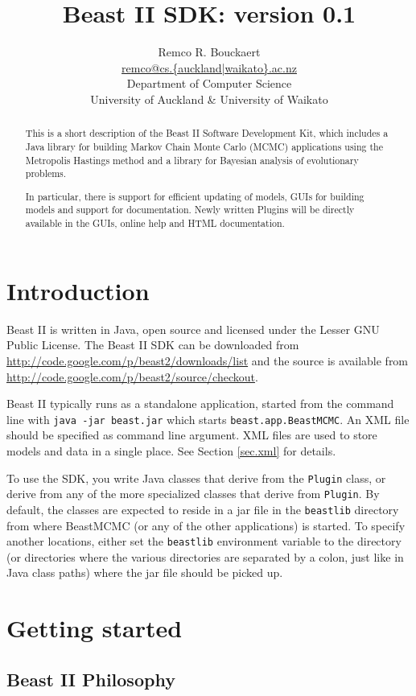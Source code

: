 \documentclass{article}
\title{Beast II SDK: version 0.1}
\author{Remco R. Bouckaert\\\url{remco@cs.{auckland|waikato}.ac.nz}\\
  Department of Computer Science\\
  University of Auckland \& University of Waikato
}
\begin{document}
\maketitle
\begin{abstract}
This is a short description of the Beast II Software Development Kit,
which includes a Java library for building Markov Chain Monte Carlo (MCMC) 
applications using the Metropolis Hastings method and a library for
Bayesian analysis of evolutionary problems.

In particular, there is support for efficient updating of models,
GUIs for building models and support for documentation. Newly written Plugins 
will be directly available in the GUIs, online help and HTML documentation.
\end{abstract}


\section{Introduction}

Beast II is written in Java, open source and licensed under the Lesser GNU Public License.
The Beast II SDK can be downloaded from \url{http://code.google.com/p/beast2/downloads/list}
and the source is available from \url{http://code.google.com/p/beast2/source/checkout}.

Beast II typically runs as a standalone application, started from the command line with
{\tt java -jar beast.jar} which starts {\tt beast.app.BeastMCMC}.
An XML file should be specified as command line argument. XML files are used to
store models and data in a single place. See Section \ref{sec.xml} for details.

To use the SDK, you write Java classes that derive from the {\tt Plugin} class, or derive
from any of the more specialized classes that derive from {\tt Plugin}. By default,
the classes are expected to reside in a jar file in the {\tt beastlib} directory
from where BeastMCMC (or any of the other applications) is started. To specify another
locations, either set the {\tt beastlib} environment variable to the directory (or
directories where the various directories are separated by a colon, just like in Java
class paths) where the jar file should be picked up.

\section{Getting started\label{sec.start}}


\subsection{Beast II Philosophy}
\end{document}
